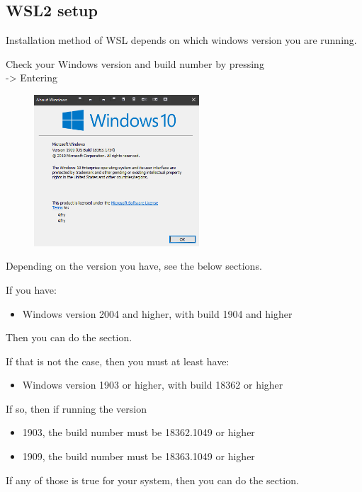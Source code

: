 \subsection{WSL2 setup}

Installation method of WSL depends on which windows version you are running.

Check your Windows version and build number by pressing\\
 -> Entering 

\begin{figure}[H]
    \includegraphics[width=0.55\textwidth]{tex/WSL/Installation_WSL_2/Figures/windows_version.PNG}
\end{figure}

Depending on the version you have, see the below sections.

If you have:
\begin{itemize}
    \item Windows version 2004 and higher, with build 1904 and higher
\end{itemize}
Then you can do the  section.

If that is not the case, then you must at least have:
\begin{itemize}
    \item Windows version 1903 or higher, with build 18362 or higher
\end{itemize}

If so, then if running the version
\begin{itemize}
    \item 1903, the build number must be 18362.1049 or higher
    \item 1909, the build number must be 18363.1049 or higher
\end{itemize}

If any of those is true for your system, then you can do the  section.



